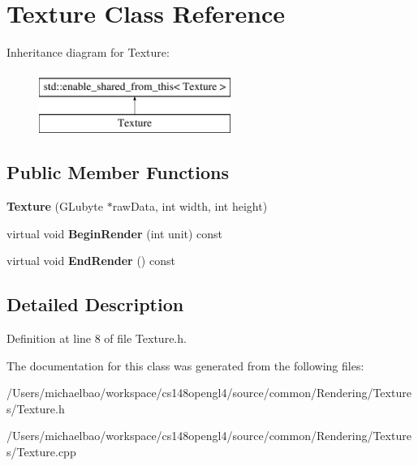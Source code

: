 \hypertarget{class_texture}{}\section{Texture Class Reference}
\label{class_texture}
Inheritance diagram for Texture\+:\begin{figure}[H]
\begin{center}
\leavevmode
\includegraphics[height=2.000000cm]{class_texture}
\end{center}
\end{figure}
\subsection*{Public Member Functions}
\begin{DoxyCompactItemize}
\item 
\hypertarget{class_texture_ad2772674616f4956ba602d0853ca5585}{}{\bfseries Texture} (G\+Lubyte $\ast$raw\+Data, int width, int height)\label{class_texture_ad2772674616f4956ba602d0853ca5585}

\item 
\hypertarget{class_texture_a2da54ce7444fbc74beccb8d17283be7e}{}virtual void {\bfseries Begin\+Render} (int unit) const \label{class_texture_a2da54ce7444fbc74beccb8d17283be7e}

\item 
\hypertarget{class_texture_a8e6ec1266ead2dcd262b025f90e99838}{}virtual void {\bfseries End\+Render} () const \label{class_texture_a8e6ec1266ead2dcd262b025f90e99838}

\end{DoxyCompactItemize}


\subsection{Detailed Description}


Definition at line 8 of file Texture.\+h.



The documentation for this class was generated from the following files\+:\begin{DoxyCompactItemize}
\item 
/\+Users/michaelbao/workspace/cs148opengl4/source/common/\+Rendering/\+Textures/Texture.\+h\item 
/\+Users/michaelbao/workspace/cs148opengl4/source/common/\+Rendering/\+Textures/Texture.\+cpp\end{DoxyCompactItemize}
